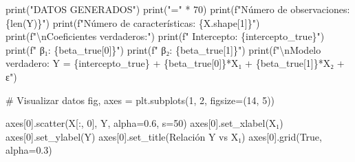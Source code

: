 \documentclass[
  doc,
  floatsintext,
  longtable,
  a4paper,
  nolmodern,
  notxfonts,
  notimes,
  12pt,
  colorlinks=true,linkcolor=blue,citecolor=blue,urlcolor=blue]{apa7}
\newenvironment{Shaded}{\begin{snugshade}}{\end{snugshade}}
\newcommand{\BuiltInTok}[1]{\textcolor[rgb]{0.00,0.23,0.31}{#1}}
\newcommand{\CharTok}[1]{\textcolor[rgb]{0.13,0.47,0.30}{#1}}
\newcommand{\CommentTok}[1]{\textcolor[rgb]{0.37,0.37,0.37}{#1}}
\newcommand{\DecValTok}[1]{\textcolor[rgb]{0.68,0.00,0.00}{#1}}
\newcommand{\FloatTok}[1]{\textcolor[rgb]{0.68,0.00,0.00}{#1}}
\newcommand{\NormalTok}[1]{\textcolor[rgb]{0.00,0.23,0.31}{#1}}
\newcommand{\OperatorTok}[1]{\textcolor[rgb]{0.37,0.37,0.37}{#1}}
\newcommand{\SpecialCharTok}[1]{\textcolor[rgb]{0.37,0.37,0.37}{#1}}
\newcommand{\SpecialStringTok}[1]{\textcolor[rgb]{0.13,0.47,0.30}{#1}}
\newcommand{\StringTok}[1]{\textcolor[rgb]{0.13,0.47,0.30}{#1}}
\newcommand{\VariableTok}[1]{\textcolor[rgb]{0.07,0.07,0.07}{#1}}
\begin{document}
\begin{Shaded}
\begin{Highlighting}[]
\BuiltInTok{print}\NormalTok{(}\StringTok{"DATOS GENERADOS"}\NormalTok{)}
\BuiltInTok{print}\NormalTok{(}\StringTok{"="} \OperatorTok{*} \DecValTok{70}\NormalTok{)}
\BuiltInTok{print}\NormalTok{(}\SpecialStringTok{f"Número de observaciones: }\SpecialCharTok{\{}\BuiltInTok{len}\NormalTok{(Y)}\SpecialCharTok{\}}\SpecialStringTok{"}\NormalTok{)}
\BuiltInTok{print}\NormalTok{(}\SpecialStringTok{f"Número de características: }\SpecialCharTok{\{}\NormalTok{X}\SpecialCharTok{.}\NormalTok{shape[}\DecValTok{1}\NormalTok{]}\SpecialCharTok{\}}\SpecialStringTok{"}\NormalTok{)}
\BuiltInTok{print}\NormalTok{(}\SpecialStringTok{f"}\CharTok{\textbackslash{}n}\SpecialStringTok{Coeficientes verdaderos:"}\NormalTok{)}
\BuiltInTok{print}\NormalTok{(}\SpecialStringTok{f"  Intercepto: }\SpecialCharTok{\{}\NormalTok{intercepto\_true}\SpecialCharTok{\}}\SpecialStringTok{"}\NormalTok{)}
\BuiltInTok{print}\NormalTok{(}\SpecialStringTok{f"  β₁: }\SpecialCharTok{\{}\NormalTok{beta\_true[}\DecValTok{0}\NormalTok{]}\SpecialCharTok{\}}\SpecialStringTok{"}\NormalTok{)}
\BuiltInTok{print}\NormalTok{(}\SpecialStringTok{f"  β₂: }\SpecialCharTok{\{}\NormalTok{beta\_true[}\DecValTok{1}\NormalTok{]}\SpecialCharTok{\}}\SpecialStringTok{"}\NormalTok{)}
\BuiltInTok{print}\NormalTok{(}\SpecialStringTok{f"}\CharTok{\textbackslash{}n}\SpecialStringTok{Modelo verdadero: Y = }\SpecialCharTok{\{}\NormalTok{intercepto\_true}\SpecialCharTok{\}}\SpecialStringTok{ + }\SpecialCharTok{\{}\NormalTok{beta\_true[}\DecValTok{0}\NormalTok{]}\SpecialCharTok{\}}\SpecialStringTok{*X₁ + }\SpecialCharTok{\{}\NormalTok{beta\_true[}\DecValTok{1}\NormalTok{]}\SpecialCharTok{\}}\SpecialStringTok{*X₂ + ε"}\NormalTok{)}

\CommentTok{\# Visualizar datos}
\NormalTok{fig, axes }\OperatorTok{=}\NormalTok{ plt.subplots(}\DecValTok{1}\NormalTok{, }\DecValTok{2}\NormalTok{, figsize}\OperatorTok{=}\NormalTok{(}\DecValTok{14}\NormalTok{, }\DecValTok{5}\NormalTok{))}

\NormalTok{axes[}\DecValTok{0}\NormalTok{].scatter(X[:, }\DecValTok{0}\NormalTok{], Y, alpha}\OperatorTok{=}\FloatTok{0.6}\NormalTok{, s}\OperatorTok{=}\DecValTok{50}\NormalTok{)}
\NormalTok{axes[}\DecValTok{0}\NormalTok{].set\_xlabel(}\StringTok{\textquotesingle{}X₁\textquotesingle{}}\NormalTok{)}
\NormalTok{axes[}\DecValTok{0}\NormalTok{].set\_ylabel(}\StringTok{\textquotesingle{}Y\textquotesingle{}}\NormalTok{)}
\NormalTok{axes[}\DecValTok{0}\NormalTok{].set\_title(}\StringTok{\textquotesingle{}Relación Y vs X₁\textquotesingle{}}\NormalTok{)}
\NormalTok{axes[}\DecValTok{0}\NormalTok{].grid(}\VariableTok{True}\NormalTok{, alpha}\OperatorTok{=}\FloatTok{0.3}\NormalTok{)}


\end{Highlighting}
\end{Shaded}
\end{document}
